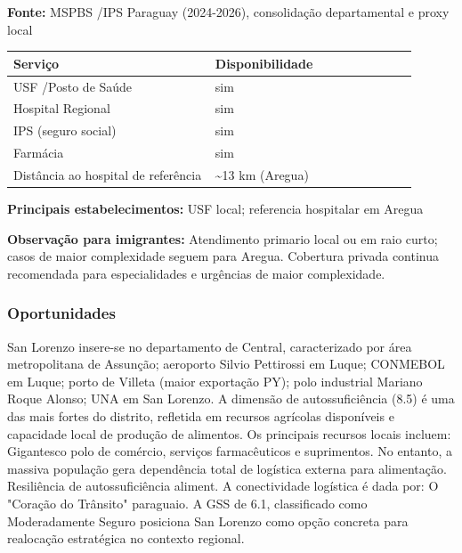 \textbf{Fonte:} MSPBS /\allowbreak  IPS Paraguay (2024-2026), consolidação
departamental e proxy local

{\def\LTcaptype{none} %
\begin{longtable}{@{}>{\raggedright\arraybackslash}p{0.45\linewidth} >{\raggedright\arraybackslash}p{0.45\linewidth}@{}}
\toprule\noalign{}
Serviço & Disponibilidade \\
\midrule\noalign{}
\endhead
\bottomrule\noalign{}
\endlastfoot
USF /\allowbreak  Posto de Saúde & sim \\
Hospital Regional & sim \\
IPS (seguro social) & sim \\
Farmácia & sim \\
Distância ao hospital de referência & \textasciitilde13 km (Aregua) \\
\end{longtable}
}

\textbf{Principais estabelecimentos:} USF local; referencia hospitalar
em Aregua

\textbf{Observação para imigrantes:} Atendimento primario local ou em
raio curto; casos de maior complexidade seguem para Aregua. Cobertura
privada continua recomendada para especialidades e urgências de maior
complexidade.
\newpage

\subsubsection*{Oportunidades}\label{oport-san-lorenzo-1114}
San Lorenzo insere-se no departamento de Central, caracterizado por área metropolitana de Assunção; aeroporto Silvio Pettirossi em Luque; CONMEBOL em Luque; porto de Villeta (maior exportação PY); polo industrial Mariano Roque Alonso; UNA em San Lorenzo. A dimensão de autossuficiência (8.5) é uma das mais fortes do distrito, refletida em recursos agrícolas disponíveis e capacidade local de produção de alimentos. Os principais recursos locais incluem: Gigantesco polo de comércio, serviços farmacêuticos e suprimentos. No entanto, a massiva população gera dependência total de logística externa para alimentação. Resiliência de autossuficiência aliment. A conectividade logística é dada por: O "Coração do Trânsito" paraguaio. A GSS de 6.1, classificado como Moderadamente Seguro posiciona San Lorenzo como opção concreta para realocação estratégica no contexto regional.

